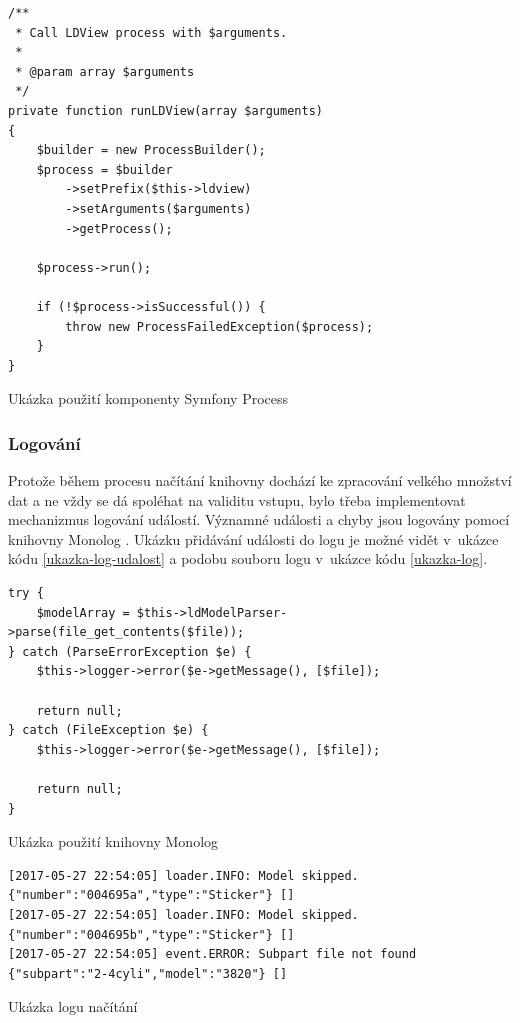 \begin{listing}[htbp]
        \begin{verbatim}
/**
 * Call LDView process with $arguments.
 *
 * @param array $arguments
 */
private function runLDView(array $arguments)
{
    $builder = new ProcessBuilder();
    $process = $builder
        ->setPrefix($this->ldview)
        ->setArguments($arguments)
        ->getProcess();

    $process->run();

    if (!$process->isSuccessful()) {
        throw new ProcessFailedException($process);
    }
}
        \end{verbatim}
    \caption{Ukázka použití komponenty Symfony Process \label{ukazka-stlconverter}}
\end{listing}

\subsubsection*{Logování}
Protože během procesu načítání knihovny dochází ke zpracování velkého množství dat a ne vždy se dá spoléhat na validitu vstupu, bylo třeba implementovat mechanizmus logování událostí. Významné události a chyby jsou logovány pomocí knihovny Monolog \autocite{symfony:monolog}. Ukázku přidávání události do logu je možné vidět v~ukázce kódu \ref{ukazka-log-udalost} a podobu souboru logu v~ukázce kódu \ref{ukazka-log}.

\begin{listing}[htbp]
        \begin{verbatim}
try {
    $modelArray = $this->ldModelParser->parse(file_get_contents($file));
} catch (ParseErrorException $e) {
    $this->logger->error($e->getMessage(), [$file]);

    return null;
} catch (FileException $e) {
    $this->logger->error($e->getMessage(), [$file]);

    return null;
}
        \end{verbatim}
    \caption{Ukázka použití knihovny Monolog \label{ukazka-log-udalost}}
\end{listing}

\begin{listing}[htbp]
        \begin{verbatim}
[2017-05-27 22:54:05] loader.INFO: Model skipped. {"number":"004695a","type":"Sticker"} []
[2017-05-27 22:54:05] loader.INFO: Model skipped. {"number":"004695b","type":"Sticker"} []
[2017-05-27 22:54:05] event.ERROR: Subpart file not found {"subpart":"2-4cyli","model":"3820"} []
        \end{verbatim}
    \caption{Ukázka logu načítání\label{ukazka-log}}
\end{listing}

